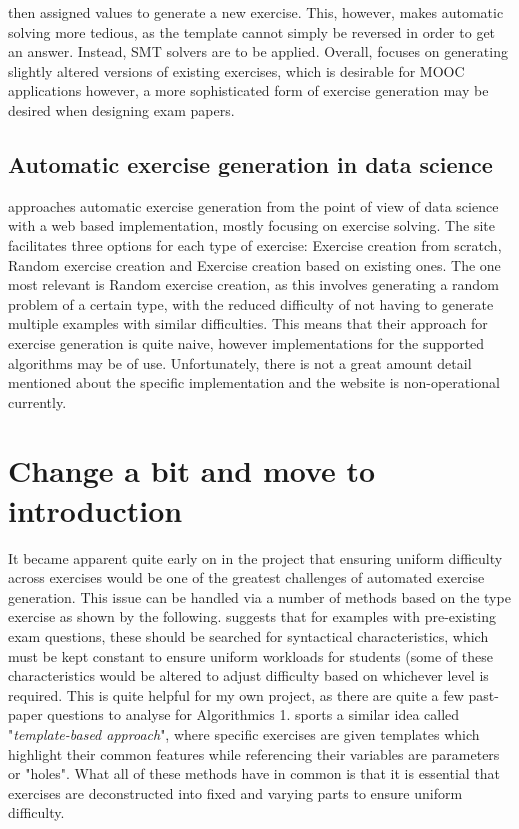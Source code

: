 \documentclass{l4proj}
\begin{document}
then assigned values to generate a new exercise. This, however, makes automatic solving more tedious, as the template cannot simply be reversed in order to get an answer. Instead, SMT solvers are to be applied. Overall, \citet{Sad12} focuses on generating slightly altered versions of existing exercises, which is desirable for MOOC applications however, a more sophisticated form of exercise generation may be desired when designing exam papers.

\subsection{Automatic exercise generation in data science}
\citet{Kot19} approaches automatic exercise generation from the point of view of data science with a web based implementation, mostly focusing on exercise solving. The site facilitates three options for each type of exercise: Exercise creation from scratch, Random exercise creation and Exercise creation based on existing ones. The one most relevant is Random exercise creation, as this involves generating a random problem of a certain type, with the reduced difficulty of not having to generate multiple examples with similar difficulties. This means that their approach for exercise generation is quite naive, however implementations for the supported algorithms may be of use. Unfortunately, there is not a great amount detail mentioned about the specific implementation and the website is non-operational currently.

\section{Change a bit and move to introduction}

It became apparent quite early on in the project that ensuring uniform difficulty across exercises would be one of the greatest challenges of automated exercise generation. This issue can be handled via a number of methods based on the type exercise as shown by the following. \citet{Hoz21} suggests that for examples with pre-existing exam questions, these should be searched for syntactical characteristics, which must be kept constant to ensure uniform workloads for students (some of these characteristics would be altered to adjust difficulty based on whichever level is required. This is quite helpful for my own project, as there are quite a few past-paper questions to analyse for Algorithmics 1. \citet{Sad12} sports a similar idea called  "\emph{template-based approach}", where specific exercises are given templates which highlight their common features while referencing their variables are parameters or "holes". What all of these methods have in common is that it is essential that exercises are deconstructed into fixed and varying parts to ensure uniform difficulty.
\end{document}
